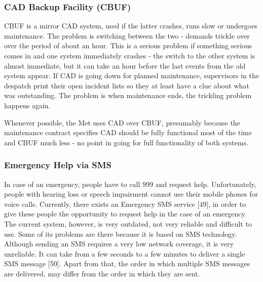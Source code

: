 \documentclass{article}
\begin{document}
\subsubsection{CAD Backup Facility (CBUF)}
CBUF is a mirror CAD system, used if the latter crashes, runs slow or undergoes maintenance. The problem is switching between the two - demands trickle over over the period of about an hour. This is a serious problem if something serious comes in and one system immediately crashes - the switch to the other system is almost immediate, but it can take an hour before the last events from the old system appear. If CAD is going down for planned maintenance, supervisors in the despatch print their open incident lists so they at least have a clue about what was outstanding. The problem is when maintenance ends, the trickling problem happens again.

Whenever possible, the Met uses CAD over CBUF, presumably because the maintenance contract specifies CAD should be fully functional most of the time and CBUF much less - no point in going for full functionality of both systems.

\subsubsection{Emergency Help via SMS}
In case of an emergency, people have to call 999 and request help. Unfortunately, people with hearing loss or speech impairment cannot use their mobile phones for voice calls. Currently, there exists an Emergency SMS service [49], in order to give these people the opportunity to request help in the case of an emergency.\\

The current system, however, is very outdated, not very reliable and difficult to use. Some of its problems are there because it is based on SMS technology. Although sending an SMS requires a very low network coverage, it is very unreliable. It can take from a few seconds to a few minutes to deliver a single SMS message [50]. Apart from that, the order in which multiple SMS messages are delivered, may differ from the order in which they are sent. \\
\end{document}
